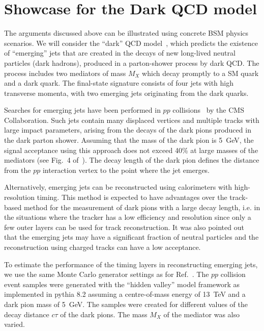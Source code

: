 \section{Showcase for the Dark QCD model}
\label{darksec}

The arguments discussed above can be illustrated using concrete BSM physics scenarios.
We will consider the ``dark'' QCD model~\cite{Bai:2013xga,Schwaller:2015gea}, which predicts 
the existence of ``emerging'' jets 
that are created in the decays of new long-lived neutral 
particles (dark hadrons), produced in a parton-shower process by dark QCD.
The process includes  two mediators of mass $M_X$ which 
decay promptly to a SM quark and a dark quark. 
The final-state signature consists of four jets with high transverse momenta, with two  
 emerging jets originating from the dark quarks.  

Searches for emerging jets have been performed in $pp$ collisions~\cite{Sirunyan:2018njd} 
by the CMS Collaboration. Such jets contain many displaced
 vertices and multiple tracks with large impact parameters, arising from the decays of the dark pions produced in the dark parton shower.
 Assuming that the mass of the dark pion is 5~GeV,  the signal acceptance using this approach does not exceed 40\% at large masses of the mediators
(see Fig.~4 of~\cite{Sirunyan:2018njd}).
The decay length of the dark pion defines the distance from the $pp$ interaction vertex 
to the point where the jet emerges. 

Alternatively, emerging jets can be reconstructed using calorimeters with high-resolution timing. This method is expected
to have advantages over the track-based method 
for the measurement of dark pions with a large decay length, i.e. in the situations where the tracker has a low
efficiency and resolution since only a few outer layers can be used for track reconstruction.
It was also pointed out~\cite{Schwaller:2015gea} that the emerging jets may have a significant fraction of neutral particles and the reconstruction
using charged tracks can have a low acceptance.

To estimate the performance of the timing layers in reconstructing emerging jets,
we use the same Monte Carlo generator settings as for Ref.~\cite{Sirunyan:2018njd}. 
The $pp$ collision event samples  were  generated with the ``hidden valley'' model framework as implemented in  {\sc pythia} 8.2 \cite{Sjostrand:2007gs}
assuming a centre-of-mass energy 
 of 13~TeV and a dark pion mass of 5~GeV. The samples were created for different values of the decay distance $c\tau$ of the dark pions.  
The  mass $M_X$ of the mediator was also varied. 

